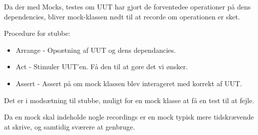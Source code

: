 Da der med Mocks, testes om UUT har gjort de forventedee operationer på dens dependencies, bliver mock-klassen nødt til at recorde om operationen er sket.

Procedure for stubbe:
\begin{itemize}
	\item Arrange - Opsætning af UUT og dens dependancies.
	\item Act - Stimuler UUT'en. Få den til at gøre det vi ønsker.
	\item Assert - Assert på om mock klassen blev interageret med korrekt af UUT.
\end{itemize}

Det er i modsætning til stubbe, muligt for en mock klasse at få en test til at fejle.

Da en mock skal indeholde nogle recordings er en mock typisk mere tidskrævende at skrive, og samtidig sværere at genbruge.


